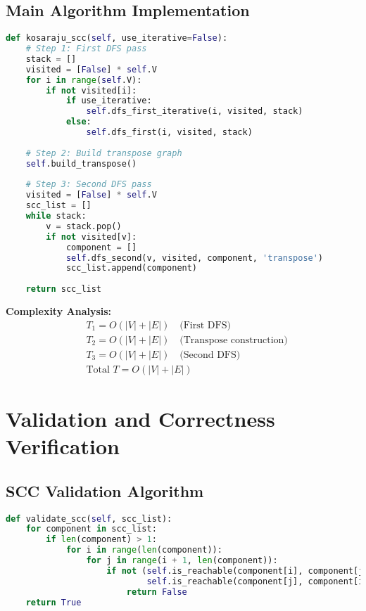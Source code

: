 \documentclass{book}
\theoremstyle{definition}
\begin{document}
\subsection{Main Algorithm Implementation}

\begin{lstlisting}[language=Python]
def kosaraju_scc(self, use_iterative=False):
    # Step 1: First DFS pass
    stack = []
    visited = [False] * self.V
    for i in range(self.V):
        if not visited[i]:
            if use_iterative:
                self.dfs_first_iterative(i, visited, stack)
            else:
                self.dfs_first(i, visited, stack)
    
    # Step 2: Build transpose graph
    self.build_transpose()
    
    # Step 3: Second DFS pass
    visited = [False] * self.V
    scc_list = []
    while stack:
        v = stack.pop()
        if not visited[v]:
            component = []
            self.dfs_second(v, visited, component, 'transpose')
            scc_list.append(component)
    
    return scc_list
\end{lstlisting}

\textbf{Complexity Analysis:}
\begin{align*}
& T_1 = O(|V| + |E|) \quad \text{(First DFS)} \\
& T_2 = O(|V| + |E|) \quad \text{(Transpose construction)} \\
& T_3 = O(|V| + |E|) \quad \text{(Second DFS)} \\
& \text{Total } T = O(|V| + |E|)
\end{align*}

\section{Validation and Correctness Verification}

\subsection{SCC Validation Algorithm}

\begin{lstlisting}[language=Python]
def validate_scc(self, scc_list):
    for component in scc_list:
        if len(component) > 1:
            for i in range(len(component)):
                for j in range(i + 1, len(component)):
                    if not (self.is_reachable(component[i], component[j]) and 
                            self.is_reachable(component[j], component[i])):
                        return False
    return True
\end{lstlisting}
\end{document}

